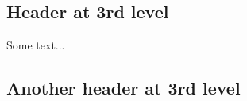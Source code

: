 \documentclass[12pt,a4paper,finnish]{tutthesis}
\begin{document}







\subsection{Header at 3rd level}
\label{sec:3rd}
Some text...

\subsection{Another header at 3rd level}
\label{sec:3rd_partner}
\end{document}
